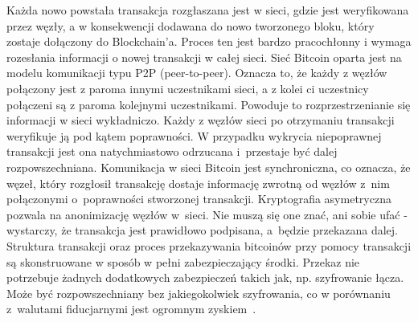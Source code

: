 \documentclass[12pt, oneside, final, openany]{mgr}
\begin{document}
\indent Każda nowo powstała transakcja rozgłaszana jest w sieci, gdzie jest weryfikowana przez węzły, a w konsekwencji dodawana do nowo tworzonego bloku, który zostaje dołączony do Blockchain'a. Proces ten jest bardzo pracochłonny i wymaga rozesłania informacji o nowej transakcji w całej sieci. Sieć Bitcoin oparta jest na modelu komunikacji typu P2P (peer-to-peer). Oznacza to, że każdy z węzłów połączony jest z paroma innymi uczestnikami sieci, a z kolei ci uczestnicy połączeni są z paroma kolejnymi uczestnikami. Powoduje to rozprzestrzenianie się informacji w sieci wykładniczo. Każdy z węzłów sieci po otrzymaniu transakcji weryfikuje ją pod kątem poprawności. W przypadku wykrycia niepoprawnej transakcji jest ona natychmiastowo odrzucana i~przestaje być dalej rozpowszechniana. Komunikacja w sieci Bitcoin jest synchroniczna, co oznacza, że węzeł, który rozgłosił transakcję dostaje informację zwrotną od węzłów z~nim połączonymi o~poprawności stworzonej transakcji. Kryptografia asymetryczna pozwala na anonimizację węzłów w~sieci. Nie muszą się one znać, ani sobie ufać - wystarczy, że transakcja jest prawidłowo podpisana, a~będzie przekazana dalej. Struktura transakcji oraz proces przekazywania bitcoinów przy pomocy transakcji są skonstruowane w sposób w pełni zabezpieczający środki. Przekaz nie potrzebuje żadnych dodatkowych zabezpieczeń takich jak, np. szyfrowanie łącza. Może być rozpowszechniany bez jakiegokolwiek szyfrowania, co w porównaniu z~walutami fiducjarnymi jest ogromnym zyskiem~\cite{Mastering}.
\end{document}

